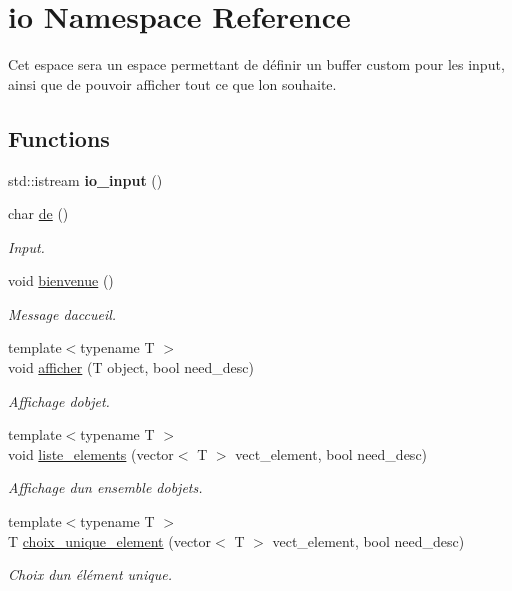 \hypertarget{namespaceio}{}\section{io Namespace Reference}
\label{namespaceio}


Cet espace sera un espace permettant de définir un buffer custom pour les input, ainsi que de pouvoir afficher tout ce que l\textquotesingle{}on souhaite.  


\subsection*{Functions}
\begin{DoxyCompactItemize}
\item 
\mbox{\label{namespaceio_aa3dbf94851f627ae6201efa77e77198c}} 
std\+::istream {\bfseries io\+\_\+input} ()
\item 
char \hyperlink{namespaceio_ae9908b55f26f07e78043d7cfad003d22}{de} ()
\begin{DoxyCompactList}\small\item\em Input. \end{DoxyCompactList}\item 
void \hyperlink{namespaceio_a7fdf85a0d766d2dcdb9870ae0458826a}{bienvenue} ()
\begin{DoxyCompactList}\small\item\em Message d\textquotesingle{}accueil. \end{DoxyCompactList}\item 
{\footnotesize template$<$typename T $>$ }\\void \hyperlink{namespaceio_a0e3593d732c42572e8b3cb09ad21c4c9}{afficher} (T object, bool need\+\_\+desc)
\begin{DoxyCompactList}\small\item\em Affichage d\textquotesingle{}objet. \end{DoxyCompactList}\item 
{\footnotesize template$<$typename T $>$ }\\void \hyperlink{namespaceio_a22b137cb32b93d8cfa7cceddf7a7e118}{liste\+\_\+elements} (vector$<$ T $>$ vect\+\_\+element, bool need\+\_\+desc)
\begin{DoxyCompactList}\small\item\em Affichage d\textquotesingle{}un ensemble d\textquotesingle{}objets. \end{DoxyCompactList}\item 
{\footnotesize template$<$typename T $>$ }\\T \hyperlink{namespaceio_ad0d98891e6dc1050ef87a4a573ba13b0}{choix\+\_\+unique\+\_\+element} (vector$<$ T $>$ vect\+\_\+element, bool need\+\_\+desc)
\begin{DoxyCompactList}\small\item\em Choix d\textquotesingle{}un élément unique. \end{DoxyCompactList}\end{DoxyCompactItemize}


